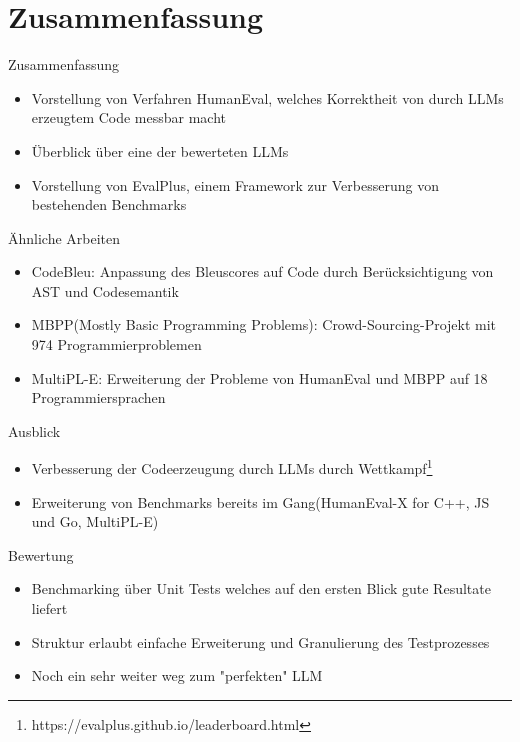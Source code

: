 \documentclass{beamer}              %
\begin{document}
\section{Zusammenfassung}
\begin{frame}{Zusammenfassung}
\begin{itemize}
    \item Vorstellung von Verfahren HumanEval, welches Korrektheit von durch LLMs erzeugtem Code messbar macht
    \item Überblick über eine der bewerteten LLMs
    \item Vorstellung von EvalPlus, einem Framework zur Verbesserung von bestehenden Benchmarks
\end{itemize}
\end{frame}

\begin{frame}{Ähnliche Arbeiten}
\begin{itemize}
    \item CodeBleu: Anpassung des Bleuscores auf Code durch Berücksichtigung von AST und Codesemantik\cite{ren2020codebleu}
    \item MBPP(Mostly Basic Programming Problems): Crowd-Sourcing-Projekt mit 974 Programmierproblemen\cite{austin2021program}
    \item MultiPL-E: Erweiterung der Probleme von HumanEval und MBPP auf 18 Programmiersprachen\cite{cassano2023multipl}

\end{itemize}
\end{frame}

\begin{frame}{Ausblick}
\begin{itemize}
    \item Verbesserung der Codeerzeugung durch LLMs durch Wettkampf\footnote{https://evalplus.github.io/leaderboard.html}
    \item Erweiterung von Benchmarks bereits im Gang(HumanEval-X\cite{zheng2023codegeex} for C++, JS und Go, MultiPL-E)
\end{itemize}
\end{frame}

\begin{frame}{Bewertung}
\begin{itemize}
    \item Benchmarking über Unit Tests welches auf den ersten Blick gute Resultate liefert
    \item Struktur erlaubt einfache Erweiterung und Granulierung des Testprozesses
    \item Noch ein sehr weiter weg zum "perfekten" LLM
\end{itemize}
\end{frame}
\end{document}
